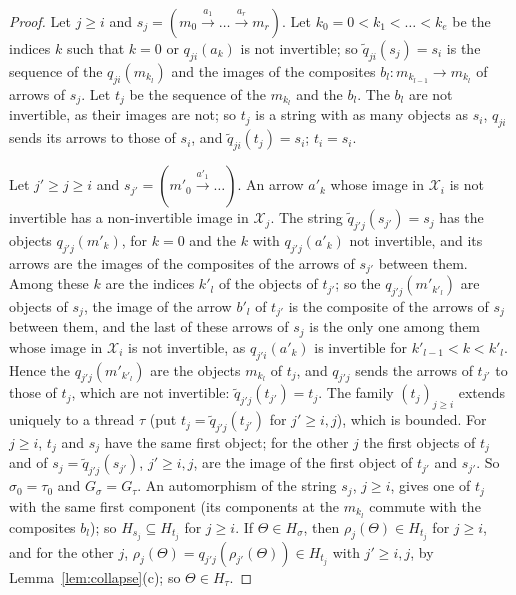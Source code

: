 \documentclass[11pt]{amsart}
\theoremstyle{definition}
\newcommand{\cX}{\mathcal X}
\begin{document}
\begin{proof}
Let $j\ge i$ and $s_j=(m_0\xrightarrow{a_1}\dots\xrightarrow{a_r}
m_r)$. Let $k_0=0<k_1<\dots<k_e$ be the indices $k$ such that $k=0$ or
$q_{ji}(a_k)$ is not invertible; so $\tilde q_{ji}(s_j)=s_i$ is the
sequence of the $q_{ji}(m_{k_l})$ and the images of the composites
$b_l\colon m_{k_{l-1}}\to m_{k_l}$ of arrows of $s_j$. Let $t_j$ be
the sequence of the $m_{k_l}$ and the $b_l$. The $b_l$ are not
invertible, as their images are not; so $t_j$ is a string with as many
objects as $s_i$, $q_{ji}$ sends its arrows to those of $s_i$, and
$\tilde q_{ji}(t_j)=s_i$; $t_i=s_i$.

Let $j'\ge j\ge i$ and $s_{j'}=(m'_0\xrightarrow{a'_1}\dots)$. An
arrow $a'_k$ whose image in $\cX_i$ is not invertible has a
non-invertible image in $\cX_j$. The string $\tilde
q_{j'j}(s_{j'})=s_j$ has the objects $q_{j'j}(m'_k)$, for $k=0$ and
the $k$ with $q_{j'j}(a'_k)$ not invertible, and its arrows are the
images of the composites of the arrows of $s_{j'}$ between them. Among
these $k$ are the indices $k'_l$ of the objects of $t_{j'}$; so the
$q_{j'j}(m'_{k'_l})$ are objects of $s_j$, the image of the arrow
$b'_l$ of $t_{j'}$ is the composite of the arrows of $s_j$ between
them, and the last of these arrows of $s_j$ is the only one among them
whose image in $\cX_i$ is not invertible, as $q_{j'i}(a'_k)$ is
invertible for $k'_{l-1}<k<k'_l$. Hence the $q_{j'j}(m'_{k'_l})$ are
the objects $m_{k_l}$ of $t_j$, and $q_{j'j}$ sends the arrows of
$t_{j'}$ to those of $t_j$, which are not invertible: $\tilde
q_{j'j}(t_{j'})=t_j$. The family $(t_j)_{j\ge i}$ extends uniquely to
a thread $\tau$ (put $t_j=\tilde q_{j'j}(t_{j'})$ for $j'\ge i,j$),
which is bounded. For $j\ge i$, $t_j$ and $s_j$ have the same first
object; for the other $j$ the first objects of $t_j$ and of
$s_j=\tilde q_{j'j}(s_{j'})$, $j'\ge i,j$, are the image of the first
object of $t_{j'}$ and $s_{j'}$. So $\sigma_0=\tau_0$ and
$G_\sigma=G_\tau$. An automorphism of the string $s_j$, $j\ge i$,
gives one of $t_j$ with the same first component (its components at
the $m_{k_l}$ commute with the composites $b_l$); so $H_{s_j}\subseteq
H_{t_j}$ for $j\ge i$. If $\Theta\in H_\sigma$, then
$\rho_j(\Theta)\in H_{t_j}$ for $j\ge i$, and for the other $j$,
$\rho_j(\Theta)=q_{j'j}(\rho_{j'}(\Theta))\in H_{t_j}$ with $j'\ge
i,j$, by Lemma~\ref{lem:collapse}(c); so $\Theta\in H_\tau$.
\end{proof}
\end{document}
